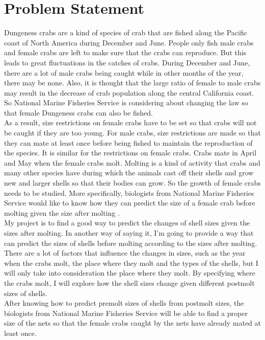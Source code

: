 \documentclass[12pt,letterpaper]{article}
\theoremstyle{definition}
\begin{document}
\section{Problem Statement}
Dungeness crabs are a kind of species of crab that are fished along the Pacific coast of North America during December and June. People only fish male crabs and female crabs are left to make sure that the crabs can reproduce. But this leads to great fluctuations in the catches of crabs. During December and June, there are a lot of male crabs being caught while in other months of the year, there may be none. Also, it is thought that the large ratio of female to male crabs may result in the decrease of crab population along the central California coast. So National Marine Fisheries Service is considering about changing the law so that female Dungeness crabs can also be fished.\\
As a result, size restrictions on female crabs have to be set so that crabs will not be caught if they are too young. For male crabs, size restrictions are made so that they can mate at least once before being fished to maintain the reproduction of the species. It is similar for the restrictions on female crabs. Crabs mate in April and May when the female crabs molt. Molting is a kind of activity that crabs and many other species have during which the animals cast off their shells and grow new and larger shells so that their bodies can grow. So the growth of female crabs needs to be studied. More specifically, biologists from National Marine Fisheries Service would like to know how they can predict the size of a female crab before molting given the size after molting \cite{deb}.\\
My project is to find a good way to predict the changes of shell sizes given the sizes after molting. In another way of saying it, I'm going to provide a way that can predict the sizes of shells before molting according to the sizes after molting. There are a lot of factors that influence the changes in sizes, such as the year when the crabs molt, the place where they molt and the types of the shells, but I will only take into consideration the place where they molt. By specifying where the crabs molt, I will explore how the shell sizes change given different postmolt sizes of shells.\\
After knowing how to predict premolt sizes of shells from postmolt sizes, the biologists from National Marine Fisheries Service will be able to find a proper size of the nets so that the female crabs caught by the nets have already mated at least once.
\end{document}

